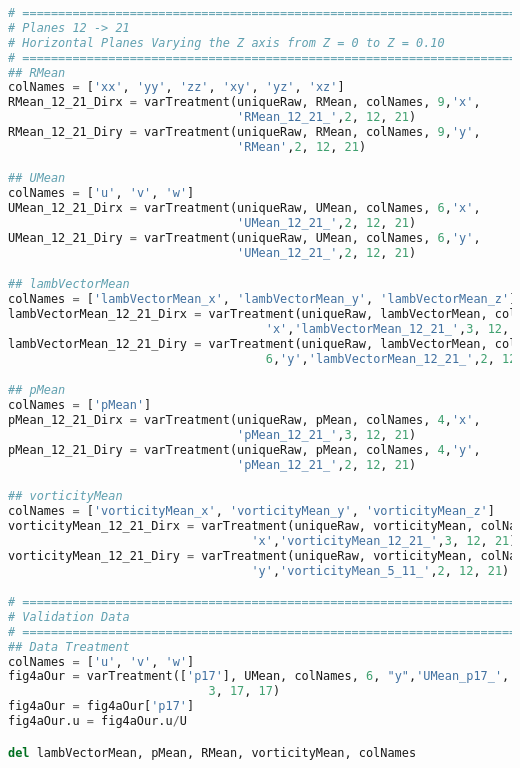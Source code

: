 \begin{lstlisting}[language=python]
# =============================================================================
# Planes 12 -> 21
# Horizontal Planes Varying the Z axis from Z = 0 to Z = 0.10
# =============================================================================
## RMean
colNames = ['xx', 'yy', 'zz', 'xy', 'yz', 'xz']
RMean_12_21_Dirx = varTreatment(uniqueRaw, RMean, colNames, 9,'x',
                                'RMean_12_21_',2, 12, 21)
RMean_12_21_Diry = varTreatment(uniqueRaw, RMean, colNames, 9,'y',
                                'RMean',2, 12, 21)

## UMean
colNames = ['u', 'v', 'w']
UMean_12_21_Dirx = varTreatment(uniqueRaw, UMean, colNames, 6,'x',
                                'UMean_12_21_',2, 12, 21)
UMean_12_21_Diry = varTreatment(uniqueRaw, UMean, colNames, 6,'y',
                                'UMean_12_21_',2, 12, 21)

## lambVectorMean
colNames = ['lambVectorMean_x', 'lambVectorMean_y', 'lambVectorMean_z']
lambVectorMean_12_21_Dirx = varTreatment(uniqueRaw, lambVectorMean, colNames, 6,
                                    'x','lambVectorMean_12_21_',3, 12, 21)
lambVectorMean_12_21_Diry = varTreatment(uniqueRaw, lambVectorMean, colNames,
                                    6,'y','lambVectorMean_12_21_',2, 12, 21)

## pMean
colNames = ['pMean']
pMean_12_21_Dirx = varTreatment(uniqueRaw, pMean, colNames, 4,'x',
                                'pMean_12_21_',3, 12, 21)
pMean_12_21_Diry = varTreatment(uniqueRaw, pMean, colNames, 4,'y',
                                'pMean_12_21_',2, 12, 21)

## vorticityMean
colNames = ['vorticityMean_x', 'vorticityMean_y', 'vorticityMean_z']
vorticityMean_12_21_Dirx = varTreatment(uniqueRaw, vorticityMean, colNames, 6,
                                  'x','vorticityMean_12_21_',3, 12, 21)
vorticityMean_12_21_Diry = varTreatment(uniqueRaw, vorticityMean, colNames, 6,
                                  'y','vorticityMean_5_11_',2, 12, 21)

# =============================================================================
# Validation Data
# =============================================================================
## Data Treatment
colNames = ['u', 'v', 'w']
fig4aOur = varTreatment(['p17'], UMean, colNames, 6, "y",'UMean_p17_',
                            3, 17, 17)
fig4aOur = fig4aOur['p17']
fig4aOur.u = fig4aOur.u/U

del lambVectorMean, pMean, RMean, vorticityMean, colNames

\end{lstlisting}

